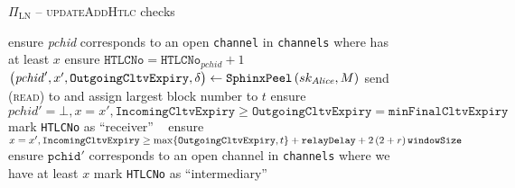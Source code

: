   \begin{figure}[H]
    \begin{protocolbox}{$\Pi_{\mathrm{LN}}$ -- \textsc{updateAddHtlc} checks}
      \begin{algorithmic}[1]
        \State ensure \textit{pchid} corresponds to an open \texttt{channel}
        in \texttt{channels} where \bob{} has at least $x$
        \State ensure $\mathtt{HTLCNo} = \mathtt{HTLCNo}_{\mathit{pchid}} + 1$
        \State $\left(\mathit{pchid}', x', \mathtt{OutgoingCltvExpiry},
        \delta\right) \gets \mathtt{SphinxPeel}\left(sk_{\mathit{Alice}}, M\right)$
        \State send (\textsc{read}) to \ledger{} and assign largest block
        number to $t$
          \State ensure $\mathit{pchid}' = \bot, x = x',
          \mathtt{IncomingCltvExpiry} \geq \mathtt{OutgoingCltvExpiry} =
          \mathtt{minFinalCltvExpiry}$
          \State mark \texttt{HTLCNo} as ``receiver''
        \Else \ 
          \State ensure $x = x', \mathtt{IncomingCltvExpiry} \geq
          \max\{\mathtt{OutgoingCltvExpiry}, t\} + \mathtt{relayDelay} +
          2\left(2 + r\right)\texttt{windowSize}{}$
          \label{alg:protocol:pay:updateAddHtlc:slack}
          \State ensure $\mathtt{pchid}'$ corresponds to an open channel in
          \texttt{channels} where we have at least $x$
          \State mark \texttt{HTLCNo} as ``intermediary''
        \EndIf
      \end{algorithmic}
    \end{protocolbox}
    \caption{}
    \label{alg:protocol:pay:updateAddHtlc:checks}
  \end{figure}


